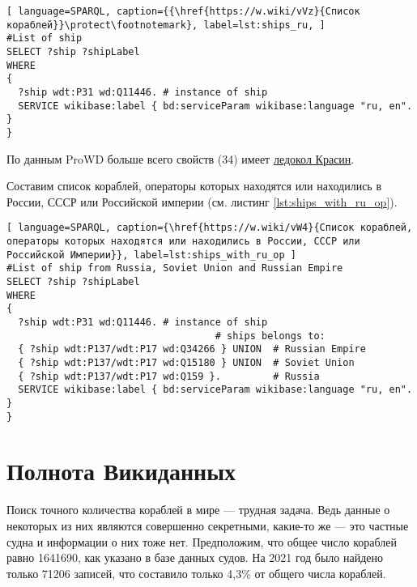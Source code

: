 \begin{lstlisting}[ language=SPARQL, caption={{\href{https://w.wiki/vVz}{Список кораблей}}\protect\footnotemark}, label=lst:ships_ru, ]
#List of ship
SELECT ?ship ?shipLabel
WHERE
{
  ?ship wdt:P31 wd:Q11446. # instance of ship
  SERVICE wikibase:label { bd:serviceParam wikibase:language "ru, en". }
}
\end{lstlisting}

По данным ProWD больше всего свойств (34) имеет \href{https://www.wikidata.org/wiki/Q281147}{ледокол Красин}\cite{ProWD_ru_ships}.

Составим список кораблей, операторы которых находятся или находились в России, СССР или Российской империи (см. листинг \ref{lst:ships_with_ru_op}).

\begin{lstlisting}[ language=SPARQL, caption={\href{https://w.wiki/vW4}{Cписок кораблей, операторы которых находятся или находились в России, СССР или Российской Империи}}, label=lst:ships_with_ru_op ]
#List of ship from Russia, Soviet Union and Russian Empire
SELECT ?ship ?shipLabel
WHERE
{
  ?ship wdt:P31 wd:Q11446. # instance of ship
                                    # ships belongs to:
  { ?ship wdt:P137/wdt:P17 wd:Q34266 } UNION  # Russian Empire
  { ?ship wdt:P137/wdt:P17 wd:Q15180 } UNION  # Soviet Union
  { ?ship wdt:P137/wdt:P17 wd:Q159 }.         # Russia
  SERVICE wikibase:label { bd:serviceParam wikibase:language "ru, en". }
}
\end{lstlisting}


\section{Полнота Викиданных}

\label{question:ship_1}

Поиск точного количества кораблей в мире — трудная задача. Ведь данные о некоторых из них являются совершенно секретными, какие-то же — это частные судна и информации о них тоже нет. Предположим, что общее число кораблей равно \num{1641690}, как указано в базе данных судов\cite{FleetMon}. На 2021 год было найдено только \num{71206} записей, что составило только 4,3\% от общего числа кораблей.


